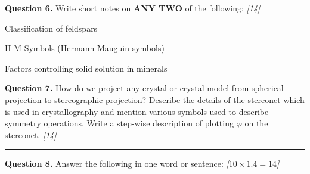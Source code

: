 \documentclass[11pt,a4paper]{article}
\newcommand{\pts}[1]{\hfill   \textit{[#1]}}
\begin{document}
\noindent   \textbf{Question 6.} Write short notes on   \textbf{ANY TWO} of the following: \pts{14}

\begin{parts}
  \item Classification of feldspars
  \item H-M Symbols (Hermann-Mauguin symbols)
  \item Factors controlling solid solution in minerals
\end{parts}

\medskip


\noindent   \textbf{Question 7.} How do we project any crystal or crystal model from spherical projection to stereographic projection? Describe the details of the stereonet which is used in crystallography and mention various symbols used to describe symmetry operations. Write a step-wise description of plotting $\varphi$ on the stereonet. \pts{14}

\bigskip


\rule{\linewidth}{0.4pt}\smallskip




\noindent   \textbf{Question 8.} Answer the following in one word or sentence: \pts{$10  \times 1.4 = 14$}
\end{document}

